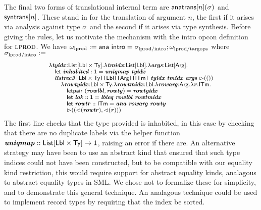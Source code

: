 \documentclass[10pt,preprint]{sigplanconf}
\begin{document}
The final two forms of translational internal term are ${\sf anatrans}[n](\sigma)$ and ${\sf syntrans}[n]$. These stand in for the translation of argument $n$, the first if it arises via analysis against type $\sigma$ and the second if it arises via type synthesis.  Before giving the rules, let us motivate the mechanism with the intro opcon definition for $\textsc{lprod}$. We have $\omega_\text{lprod} := {\sf ana}~{\sf intro}=\sigma_\text{lprod/intro}; \omega_\text{lprod/targops}$ where $\sigma_\text{lprod/intro} :=$\vspace{-5px}
\[\small
\begin{array}{l}
\lambda\svar{tyidx}{:}\klist{\klbl\times\kty}.\lambda\svar{tmidx}{:}\klist{\klbl}.\lambda\svar{args}{:}\kargs.\\
\quad \keyw{let}~\svar{inhabited}:\kunit=\svar{uniqmap}~\svar{tyidx}\\
\quad \skap{\kitm}{\skap{\karg}{\skap{\klbl}{\skap{\klbl\times\kty}{\svar{listrec3}}}}}~\svar{tyidx}~\svar{tmidx}~\svar{args}~\sqitm{\itriv}\\
\quad\quad \lambda \svar{rowtyidx}{:}\klbl\times\kty.\lambda \svar{rowtmidx}{:}\klbl.\lambda\svar{rowarg}{:}\karg.\lambda \svar{r}{:}\kitm.\\
\quad\quad\quad \keyw{letpair}~(\svar{rowlbl}, \svar{rowty})=\svar{rowtyidx}\\
\quad\quad\quad \keyw{let}~\svar{lok}::\kunit=\svar{lbleq}~\svar{rowlbl} ~\svar{rowtmidx}\\
\quad\quad\quad \keyw{let}~\svar{rowtr} :: \kitm = \svar{ana}~\svar{rowarg}~\svar{rowty}\\
\quad\quad\quad \sqitm{(\quq{\svar{rowtr}}, \quq{\svar{r}})
}
\end{array}
\]
The first line checks that the type provided is inhabited, in this case by checking that there are no duplicate labels via the helper function ${\textbf{\textit{uniqmap}}} :: {\sf List}[{\sf Lbl} \times {\sf Ty}]\rightarrow {\sf 1}$, raising an error if there are. An alternative strategy may have been to use an abstract kind that ensured that such type indices could not have been constructed, but to be compatible with our equality kind restriction, this would require support for abstract equality kinds, analagous to abstract equality types in SML. We chose not to formalize these for simplicity, and to demonstrate this general technique. An analagous technique could be used to implement record types by requiring that the index be sorted.%
\end{document}
